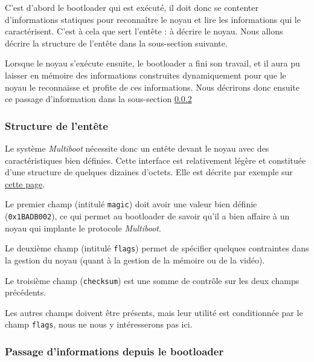    C'est d'abord le bootloader qui est exécuté, il doit donc se
contenter d'informations statiques pour reconnaître le noyau et lire
les informations qui le caractérisent. C'est à cela que sert l'entête
: à décrire le noyau. Nous allons décrire la structure de l'entête
dans la sous-section suivante.

   Lorsque le noyau s'exécute ensuite, le bootloader a fini son
travail, et il aura pu laisser en mémoire des informations construites
dynamiquement pour que le noyau le reconnaisse et profite de ces
informations. Nous décrirons donc ensuite ce passage d'information
dans la sous-section \ref{subsection:bootparam}
     
%
\subsubsection{Structure de l'entête}

   Le système {\em Multiboot} nécessite donc un entête devant le noyau
avec des caractéristiques bien définies. Cette interface est
relativement légère et constituée d'une structure de quelques dizaines
d'octets. Elle est décrite par exemple sur
\href{https://www.gnu.org/software/grub/manual/multiboot/multiboot.html#Architecture}{cette
  page}.

   Le premier champ (intitulé \lstinline!magic!) doit avoir une valeur
bien définie (\lstinline!0x1BADB002!), ce qui permet au bootloader de
savoir qu'il a bien affaire à un noyau qui implante le protocole {\em
  Multiboot}.

   Le deuxième champ (intitulé \lstinline!flags!) permet de spécifier
quelques contraintes dans la gestion du noyau (quant à la gestion de
la mémoire ou de la vidéo).

   Le  troisième champ (\lstinline!checksum!) est une somme de
contrôle sur les deux champs précédents.

   Les autres champs doivent être présents, mais leur utilité est
conditionnée par le champ \lstinline!flags!, nous ne nous y
intéresserons pas ici.   

%
\subsubsection{Passage d'informations depuis le bootloader}
\label{subsection:bootparam}

